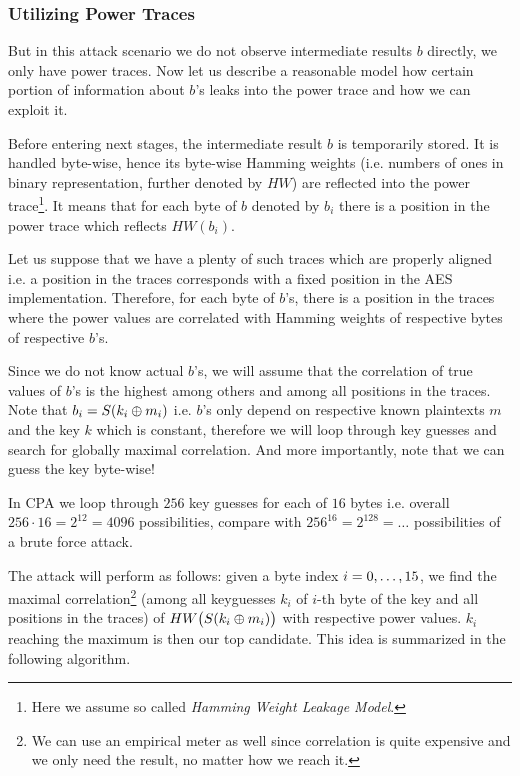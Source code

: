 \subsubsection{Utilizing Power Traces}
	
	But in this attack scenario we do not observe intermediate results $b$ directly, we only have power traces. Now let us describe a reasonable model how certain portion of information about $b$'s leaks into the power trace and how we can exploit it.
	
	Before entering next stages, the intermediate result $b$ is temporarily stored. It is handled byte-wise, hence its byte-wise Hamming weights (i.e. numbers of ones in binary representation, further denoted by $HW$) are reflected into the power trace\footnote{Here we assume so called {\em Hamming Weight Leakage Model}.}. It means that for each byte of $b$ denoted by $b_i$ there is a position in the power trace which reflects $HW(b_i)$.
	
	Let us suppose that we have a plenty of such traces which are properly aligned i.e. a position in the traces corresponds with a fixed position in the AES implementation. Therefore, for each byte of $b$'s, there is a position in the traces where the power values are correlated with Hamming weights of respective bytes of respective $b$'s.
	
	Since we do not know actual $b$'s, we will assume that the correlation of true values of $b$'s is the highest among others and among all positions in the traces. Note that $b_i = S(k_i\oplus m_i)$ i.e. $b$'s only depend on respective known plaintexts $m$ and the key $k$ which is constant, therefore we will loop through key guesses and search for globally maximal correlation. And more importantly, note that we can guess the key byte-wise!
	
	\begin{note}
	\label{note:brutevssca}
		In CPA we loop through $256$ key guesses for each of $16$ bytes i.e. overall $256\cdot 16 = 2^{12} = 4096$ possibilities, compare with $256^{16} = 2^{128} = \ldots$ possibilities of a brute force attack.
	\end{note}
	
	The attack will perform as follows: given a byte index $i=0 , \ldots , 15$, we find the maximal correlation\footnote{We can use an empirical meter as well since correlation is quite expensive and we only need the result, no matter how we reach it.} (among all keyguesses $k_i$ of $i$-th byte of the key and all positions in the traces) of $HW\bigl(S(k_i\oplus m_i)\bigr)$ with respective power values. $k_i$ reaching the maximum is then our top candidate. This idea is summarized in the following algorithm.
	
